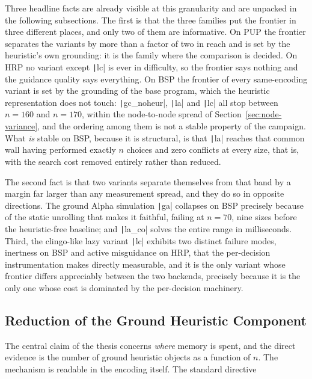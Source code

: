 Three headline facts are already visible at this granularity and are unpacked in the following subsections. The first is that the three families put the frontier in three different places, and only two of them are informative. On PUP the frontier separates the variants by more than a factor of two in reach and is set by the heuristic's own grounding: it is the family where the comparison is decided. On HRP no variant except \texttt|lc| is ever in difficulty, so the frontier says nothing and the guidance quality says everything. On BSP the frontier of every same-encoding variant is set by the grounding of the base program, which the heuristic representation does not touch: \texttt|gc_noheur|, \texttt|la| and \texttt|lc| all stop between $n=160$ and $n=170$, within the node-to-node spread of Section~\ref{sec:node-variance}, and the ordering among them is not a stable property of the campaign. What \emph{is} stable on BSP, because it is structural, is that \texttt|la| reaches that common wall having performed exactly $n$ choices and zero conflicts at every size, that is, with the search cost removed entirely rather than reduced.

The second fact is that two variants separate themselves from that band by a margin far larger than any measurement spread, and they do so in opposite directions. The ground Alpha simulation \texttt|ga| collapses on BSP precisely because of the static unrolling that makes it faithful, failing at $n=70$, nine sizes before the heuristic-free baseline; and \texttt|la_co| solves the entire range in milliseconds. Third, the clingo-like lazy variant \texttt|lc| exhibits two distinct failure modes, inertness on BSP and active misguidance on HRP, that the per-decision instrumentation makes directly measurable, and it is the only variant whose frontier differs appreciably between the two backends, precisely because it is the only one whose cost is dominated by the per-decision machinery.

\subsection{Reduction of the Ground Heuristic Component}

The central claim of the thesis concerns \emph{where} memory is spent, and the direct evidence is the number of ground heuristic objects as a function of $n$. The mechanism is readable in the encoding itself. The standard directive

